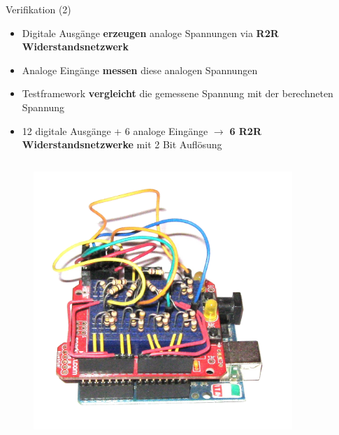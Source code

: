 \documentclass{beamer}
\begin{document}
\begin{frame}{Verifikation (2)}
	\begin{itemize}
		\item Digitale Ausg\"ange \textbf{erzeugen} analoge Spannungen via \textbf{R2R Widerstandsnetzwerk}
		\item Analoge Eing\"ange \textbf{messen} diese analogen Spannungen
		\item Testframework \textbf{vergleicht} die gemessene Spannung mit der berechneten Spannung
	\end{itemize}
	\begin{itemize}
		\item 12 digitale Ausg\"ange + 6 analoge Eing\"ange $\rightarrow$ \textbf{6 R2R Widerstandsnetzwerke} mit 2 Bit Aufl\"osung
	\end{itemize}
	\begin{columns}
		\begin{column}{0.4\textwidth}
			\begin{figure}[htbp]
				\centering
				\includegraphics[scale=0.2]{./images/arduinoio-r2r.png}
			\end{figure}
		\end{column}
		\begin{column}{0.4\textwidth}
			\begin{figure}[htbp]
				\centering

\end{figure}
\end{column}
\end{columns}
\end{frame}
\end{document}
